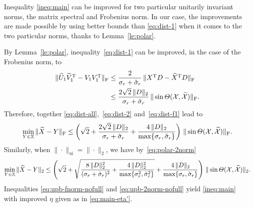 \documentclass[11pt]{article}
\def\bbX{\mathbb{X}}
\def\cX{{\cal X}}
\DeclareMathOperator{\F}{F}
\DeclareMathOperator{\T}{T}
\DeclareMathOperator{\UI}{ui}
\def\wtd{\widetilde}
\def\what{\widehat}
\theoremstyle{definition}
\numberwithin{equation}{section}
\numberwithin{figure}{section}
\numberwithin{table}{section}
\begin{document}
Inequality \eqref{ineq:main} can be improved for two particular unitarily invariant norms, the matrix spectral and Frobenius norm.
In our case, the improvements are made possible by using better bounds than \eqref{eq:dist-1} when it comes to
the two particular norms, thanks to Lemma~\ref{le:polar}.

By Lemma~\ref{le:polar},
inequality~\eqref{eq:dist-1} can be improved, in the case of the Frobenius norm, to
\begin{align}\label{eq:dist-f1}
\notag \|\what U_1\wtd V_1^{\T}-V_1V_1^{\T}\|_{\F}&\le\frac{2}{\sigma_r+\tilde\sigma_r}\,
\|X^{\T}D-\what X^{\T}D\|_{\F}\\
&\le \frac{2\sqrt 2\,\|D\|_2}{\sigma_r+\tilde\sigma_r}\,\|\sin\Theta(\cX,\wtd\cX)\|_{\F}.
\end{align}
Therefore, together \eqref{eq:dist-all},~\eqref{eq:dist-2} and~\eqref{eq:dist-f1} lead to
\begin{equation}\label{eq:upb-fnorm-nofull}
\min_{Y\in\bbX}\|\wtd X-Y\|_{\F}\le\left(\sqrt 2+\frac{2\sqrt 2\,\|D\|_2}{\sigma_r+\tilde\sigma_r}
+\frac{4\,\|D\|_2}{\max\{\sigma_r,\tilde\sigma_r\}}\right)\,\|\sin\Theta(\cX,\wtd\cX)\|_{\F}.
\end{equation}
Similarly, when $\|\cdot\|_{\UI}=\|\cdot\|_2$, we have by~\eqref{eq:polar-2norm}
\begin{equation}\label{eq:upb-2norm-nofull}
\min_{Y\in\bbX}\|\wtd X-Y\|_2
    \le\left(\sqrt 2+\sqrt{\dfrac{8\,\|D\|_2^2}{(\sigma_r+\tilde\sigma_r)^2}
             +\dfrac{4\,\|D\|_2^2}{\max\{\sigma_r^2,\tilde\sigma_r^2\}}}
             +\frac{4\,\|D\|_2}{\max\{\sigma_r,\tilde\sigma_r\}}\right)
             \,\|\sin\Theta(\cX,\wtd\cX)\|_2.
\end{equation}
Inequalities \eqref{eq:upb-fnorm-nofull} and \eqref{eq:upb-2norm-nofull} yield
\eqref{ineq:main} with  improved $\eta$ given as in \eqref{eq:main-eta'}.
\end{document}
